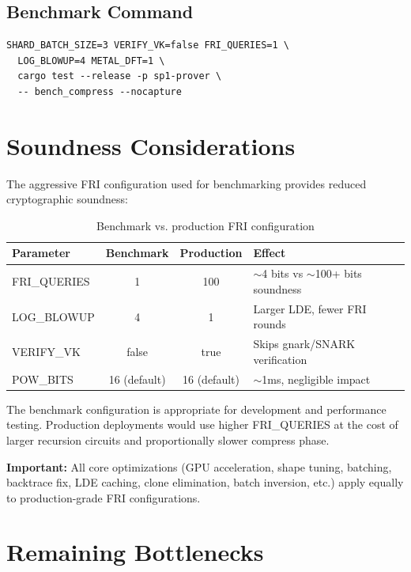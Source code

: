 \documentclass[11pt,a4paper]{article}
\begin{document}
\subsection{Benchmark Command}

\begin{lstlisting}
SHARD_BATCH_SIZE=3 VERIFY_VK=false FRI_QUERIES=1 \
  LOG_BLOWUP=4 METAL_DFT=1 \
  cargo test --release -p sp1-prover \
  -- bench_compress --nocapture
\end{lstlisting}

\section{Soundness Considerations}

The aggressive FRI configuration used for benchmarking provides reduced cryptographic soundness:

\begin{table}[h]
\centering
\begin{tabular}{@{}lccl@{}}
\toprule
\textbf{Parameter} & \textbf{Benchmark} & \textbf{Production} & \textbf{Effect} \\
\midrule
FRI\_QUERIES & 1 & 100 & $\sim$4 bits vs $\sim$100+ bits soundness \\
LOG\_BLOWUP & 4 & 1 & Larger LDE, fewer FRI rounds \\
VERIFY\_VK & false & true & Skips gnark/SNARK verification \\
POW\_BITS & 16 (default) & 16 (default) & $\sim$1ms, negligible impact \\
\bottomrule
\end{tabular}
\caption{Benchmark vs. production FRI configuration}
\end{table}

The benchmark configuration is appropriate for development and performance testing. Production deployments would use higher FRI\_QUERIES at the cost of larger recursion circuits and proportionally slower compress phase.

\textbf{Important:} All core optimizations (GPU acceleration, shape tuning, batching, backtrace fix, LDE caching, clone elimination, batch inversion, etc.) apply equally to production-grade FRI configurations.

\section{Remaining Bottlenecks}
\end{document}
